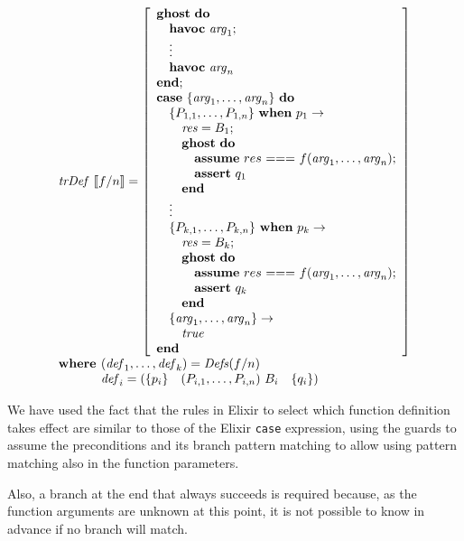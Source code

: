 \[
\begin{array}{l}
\trDef{f/n} = \left[ \begin{array}{l}
\ghostE~\doW\\
\quad\havocE~\mathit{arg}_1;\\
\quad\vdots\\
\quad\havocE~\mathit{arg}_n\\
\Wend;\\
\caseE~\{\mathit{arg}_1,\dots,\mathit{arg}_n\}~\doW \\
\quad \{P_{1,1},\dots,P_{1,n}\}~\whenE~p_1 \rightarrow\\ 
\quad\quad \mathit{res} = B_1; \\
\quad\quad \ghostE~\doW\\ 
\quad\quad\quad\assumeE~res~\mathit{===}~f(\mathit{arg}_1,\dots,\mathit{arg}_n);\\
\quad\quad\quad\assertE~q_1\\
\quad\quad \Wend\\
\quad\vdots\\
\quad \{P_{k,1},\dots,P_{k,n}\}~\whenE~p_k \rightarrow\\ 
\quad\quad \mathit{res} = B_k; \\
\quad\quad \ghostE~\doW\\ 
\quad\quad\quad\assumeE~res~\mathit{===}~f(\mathit{arg}_1,\dots,\mathit{arg}_n);\\
\quad\quad\quad\assertE~q_k\\
\quad\quad \Wend\\
\quad \{\mathit{arg}_1,\dots,\mathit{arg}_n\} \rightarrow\\
\quad\quad\true\\ 
\Wend
\end{array}
\right]\\
\textbf{where } (\mathit{def}_1, \dots, \mathit{def}_k) = \Defs{f/n}\\
\phantom{\textbf{where }} \mathit{def}_i = \left(\{ p_i \}  \quad (P_{i,1}, \dots, P_{i,n})~B_i \quad \{ q_i \} \right) 
\end{array}
\]

We have used the fact that the rules in Elixir to select which function
definition takes effect are similar to those of the Elixir \verb|case|
expression, using the guards to assume the preconditions and its branch pattern
matching to allow using pattern matching also in the function parameters.

Also, a branch at the end that always succeeds is required because, as the 
function arguments are unknown at this point, it is not possible to know in 
advance if no branch will match. 

